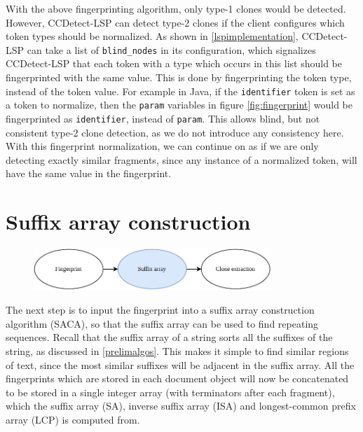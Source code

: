 With the above fingerprinting algorithm, only type-1 clones would be detected. However,
CCDetect-LSP can detect type-2 clones if the client configures which token types should be
normalized. As shown in \cref{lspimplementation}, CCDetect-LSP can take a list of
\verb|blind_nodes| in its configuration, which signalizes CCDetect-LSP that each token
with a type which occurs in this list should be fingerprinted with the same value. This is
done by fingerprinting the token type, instead of the token value. For example in Java, if
the \verb|identifier| token is set as a token to normalize, then the \verb|param|
variables in figure \ref{fig:fingerprint} would be fingerprinted as \verb|identifier|,
instead of \verb|param|. This allows blind, but not consistent type-2 clone detection, as
we do not introduce any consistency here. With this fingerprint normalization, we can
continue on as if we are only detecting exactly similar fragments, since any instance of a
normalized token, will have the same value in the fingerprint.

\section{Suffix array construction}

\begin{figure}[H]
    \begin{center}
        \includegraphics[width=0.8\textwidth]{figures/phases/phases_suffix.drawio.pdf}
    \end{center}
\end{figure}

The next step is to input the fingerprint into a suffix array construction algorithm
(SACA), so that the suffix array can be used to find repeating sequences. Recall that the
suffix array of a string sorts all the suffixes of the string, as discussed in
\cref{prelimalgos}. This makes it simple to find similar regions of text, since the most
similar suffixes will be adjacent in the suffix array. All the fingerprints which are
stored in each document object will now be concatenated to be stored in a single integer
array (with terminators after each fragment), which the suffix array (SA), inverse suffix
array (ISA) and longest-common prefix array (LCP) is computed from.

